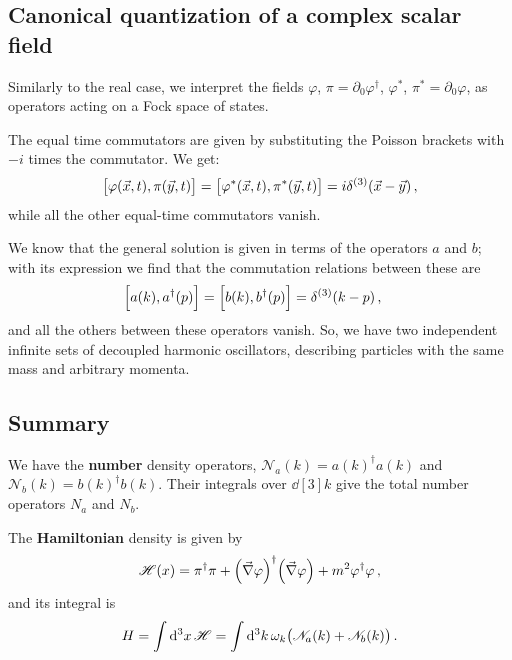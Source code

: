 \documentclass[main.tex]{subfiles}
\begin{document}
\subsection{Canonical quantization of a complex scalar field}

Similarly to the real case, we interpret the fields \(\varphi \), \(\pi = \partial_0 \varphi ^\dag\), \(\varphi^{*}\), \(\pi^{*} = \partial_{0} \varphi \), as operators acting on a Fock space of states.

The equal time commutators are given by substituting the Poisson brackets with \(-i\) times the commutator. We get: 
%
\begin{align}
\qty[\varphi (\vec{x}, t), \pi (\vec{y}, t)] =
\qty[\varphi^{*} (\vec{x}, t), \pi^{*} (\vec{y}, t)] = i \delta^{(3)} (\vec{x} - \vec{y}) 
\,,
\end{align}
%
while all the other equal-time commutators vanish.

We know that the general solution  is given in terms of the operators \(a\) and \(b\); with its expression we find that the commutation relations between these are 
%
\begin{align}
\qty[a(k), a ^\dag(p)] = \qty[b(k), b ^\dag (p)] &= \delta^{(3)} (k-p)
\,,
\end{align}
%
and all the others between these operators vanish. 
So, we have two independent infinite sets of decoupled harmonic oscillators, describing particles with the same mass and arbitrary momenta. 

\subsection{Summary}

We have the \textbf{number} density operators, \(\mathscr{N}_{a} (k) = a(k) ^\dag a(k)\) and \(\mathscr{N}_{b} (k) = b(k) ^\dag b(k)\). 
Their integrals over \(\dd[3]{k}\) give the total number operators \(N_a\) and \(N_b\). 

The \textbf{Hamiltonian} density is given by 
%
\begin{align}
\mathscr{H}(x) = \pi ^\dag \pi 
+ \qty(\vec{\nabla} \varphi ) ^\dag \qty(\vec{\nabla} \varphi )
+ m^2 \varphi ^\dag \varphi  
\,,
\end{align}
%
and its integral is 
%
\begin{align}
H = \int \dd[3]{x} \mathscr{H} = 
\int \dd[3]{k} \omega_{k} \qty(\mathscr{N}_a (k) + \mathscr{N}_b (k))
\,.
\end{align}
\end{document}
